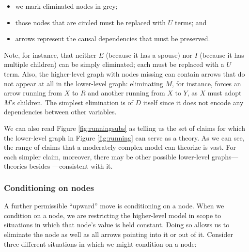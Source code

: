 \documentclass[12pt,]{book}
\providecommand{\tightlist}{%
  \setlength{\itemsep}{0pt}\setlength{\parskip}{0pt}}
\begin{document}
\begin{itemize}
\tightlist
\item
  we mark eliminated nodes in grey;
\item
  those nodes that are circled must be replaced with \(U\) terms; and
\item
  arrows represent the causal dependencies that must be preserved.
\end{itemize}

Note, for instance, that neither \(E\) (because it has a spouse) nor \(I\) (because it has multiple children) can be simply eliminated; each must be replaced with a \(U\) term. Also, the higher-level graph with nodes missing can contain arrows that do not appear at all in the lower-level graph: eliminating \(M\), for instance, forces an arrow running from \(X\) to \(R\) and another running from \(X\) to \(Y\), as \(X\) must adopt \(M\)'s children. The simplest elimination is of \(D\) itself since it does not encode any dependencies between other variables.

We can also read Figure \ref{fig:runningsubs} as telling us the set of claims for which the lower-level graph in Figure \ref{fig:running} can serve as a theory. As we can see, the range of claims that a moderately complex model can theorize is vast. For each simpler claim, moreover, there may be other possible lower-level graphs---theories besides ---consistent with it.

\hypertarget{conditioning-on-nodes}{%
\subsubsection{Conditioning on nodes}\label{conditioning-on-nodes}}

A further permissible ``upward'' move is conditioning on a node. When we condition on a node, we are restricting the higher-level model in scope to situations in which that node's value is held constant. Doing so allows us to eliminate the node as well as all arrows pointing into it or out of it. Consider three different situations in which we might condition on a node:
\end{document}
